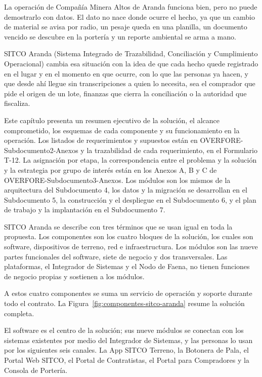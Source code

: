 \documentclass[subdoc]{../../comun/overfore}
\begin{document}
La operación de Compañía Minera Altos de Aranda funciona bien, pero no puede demostrarlo con datos. El dato no nace donde ocurre el hecho, ya que un cambio de material se avisa por radio, un pesaje queda en una planilla, un documento vencido se descubre en la portería y un reporte ambiental se arma a mano.

SITCO Aranda (Sistema Integrado de Trazabilidad, Conciliación y Cumplimiento Operacional) cambia esa situación con la idea de que cada hecho quede registrado en el lugar y en el momento en que ocurre, con lo que las personas ya hacen, y que desde ahí llegue sin transcripciones a quien lo necesita, sea el comprador que pide el origen de un lote, finanzas que cierra la conciliación o la autoridad que fiscaliza.

Este capítulo presenta un resumen ejecutivo de la solución, el alcance comprometido, los esquemas de cada componente y su funcionamiento en la operación. Los listados de requerimientos y supuestos están en OVERFORE-Subdocumento2-Anexos y la trazabilidad de cada requerimiento, en el Formulario T-12. La asignación por etapa, la correspondencia entre el problema y la solución y la estrategia por grupo de interés están en los Anexos A, B y C de OVERFORE-Subdocumento3-Anexos. Los módulos son los mismos de la arquitectura del Subdocumento 4, los datos y la migración se desarrollan en el Subdocumento 5, la construcción y el despliegue en el Subdocumento 6, y el plan de trabajo y la implantación en el Subdocumento 7.

SITCO Aranda se describe con tres términos que se usan igual en toda la propuesta. Los componentes son los cuatro bloques de la solución, los cuales son software, dispositivos de terreno, red e infraestructura. Los módulos son las nueve partes funcionales del software, siete de negocio y dos transversales. Las plataformas, el Integrador de Sistemas y el Nodo de Faena, no tienen funciones de negocio propias y sostienen a los módulos.

A estos cuatro componentes se suma un servicio de operación y soporte durante todo el contrato. La Figura~\ref{fig:componentes-sitco-aranda} resume la solución completa.

\begin{horizontal}
\end{horizontal}
El software es el centro de la solución; sus nueve módulos se conectan con los sistemas existentes por medio del Integrador de Sistemas, y las personas lo usan por los siguientes seis canales. La App SITCO Terreno, la Botonera de Pala, el Portal Web SITCO, el Portal de Contratistas, el Portal para Compradores y la Consola de Portería.
\end{document}
